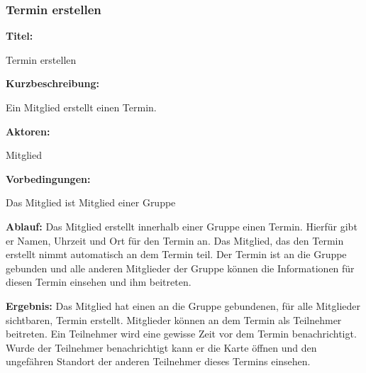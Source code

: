 \documentclass{scrartcl}
\begin{document}
	\subsubsection{Termin erstellen}
	\begin{description}
		\item \textbf{Titel:}
		\begin{description}
			\item Termin erstellen
		\end{description}
		\item \textbf{Kurzbeschreibung:}
		\begin{description}
			\item Ein Mitglied erstellt einen Termin.
		\end{description}
		\item \textbf{Aktoren:}
		\begin{description}
			\item \gls{Mitglied}
		\end{description}
		\item \textbf{Vorbedingungen:}
		\begin{description}
			\item Das Mitglied ist Mitglied einer Gruppe
		\end{description}
		\item \textbf{Ablauf:} \newline Das Mitglied erstellt innerhalb einer Gruppe einen Termin. Hierfür gibt er Namen, Uhrzeit und Ort für den Termin an. Das Mitglied, das den Termin erstellt nimmt automatisch an dem Termin teil. Der Termin ist an die Gruppe gebunden und alle anderen Mitglieder der Gruppe können die Informationen für diesen Termin einsehen und ihm beitreten.
		\item \textbf{Ergebnis:} \newline Das Mitglied hat einen an die Gruppe gebundenen, für alle Mitglieder sichtbaren, Termin erstellt. Mitglieder können an dem Termin als \gls{Teilnehmer} beitreten. Ein Teilnehmer wird eine gewisse Zeit vor dem Termin benachrichtigt. Wurde der Teilnehmer benachrichtigt kann er die Karte öffnen und den ungefähren Standort der anderen Teilnehmer dieses Termins einsehen.
	\end{description}
	
	\newpage
	
\end{document}
